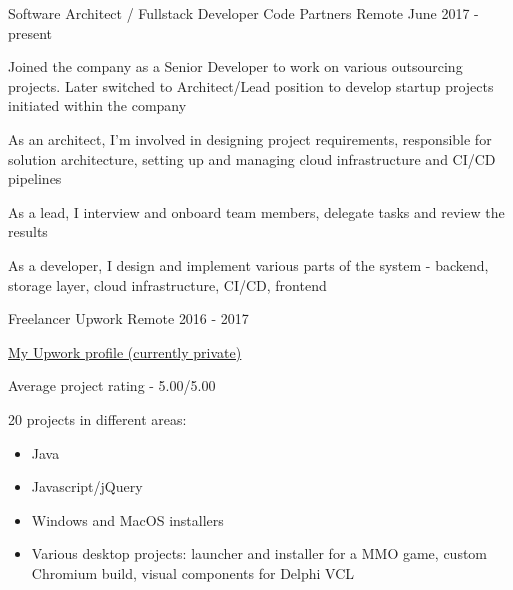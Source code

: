

\begin{cventries}

  \cventry
  {Software Architect / Fullstack Developer} %
  {Code Partners} %
  {Remote} %
  {June 2017 - present} %
  {
    \begin{cvitems} %
      \item Joined the company as a Senior Developer to work on various outsourcing projects. Later switched to Architect/Lead position to develop startup projects initiated within the company
      \item As an architect, I'm involved in designing project requirements, responsible for solution architecture, setting up and managing cloud infrastructure and CI/CD pipelines
      \item As a lead, I interview and onboard team members, delegate tasks and review the results
      \item As a developer, I design and implement various parts of the system - backend, storage layer, cloud infrastructure, CI/CD, frontend
    \end{cvitems}
  }

  \cventry
    {Freelancer} %
    {Upwork} %
    {Remote} %
    {2016 - 2017} %
    {
      \begin{cvitems} %
        \item {\color{awesome-skyblue}\href{https://www.upwork.com/freelancers/~01fe466a51a96a2b6a}{\underline{My Upwork profile (currently private)}}}
        \item {Average project rating - 5.00/5.00}
        \item {
        	20 projects in different areas:
            \begin{itemize}[label={•},leftmargin=10pt]
				\item Java
				\item Javascript/jQuery
				\item Windows and MacOS installers
            	\item Various desktop projects: launcher and installer for a MMO game, custom Chromium build, visual components for Delphi VCL
			\end{itemize}
        }
      \end{cvitems}
    }


\end{cventries}
